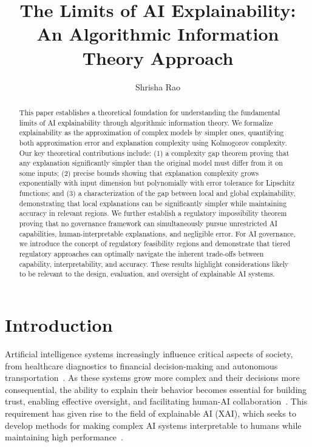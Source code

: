 \documentclass[11pt,letter,leqno]{article}
\title{The Limits of AI Explainability: \\An Algorithmic Information Theory Approach}
\author{Shrisha Rao}
\date{}
\begin{document}
\maketitle

\begin{abstract}
  This paper establishes a theoretical foundation for understanding the fundamental limits of AI explainability through algorithmic information theory.  We formalize explainability as the approximation of complex models by simpler ones, quantifying both approximation error and explanation complexity using Kolmogorov complexity.  Our key theoretical contributions include: (1) a complexity gap theorem proving that any explanation significantly simpler than the original model must differ from it on some inputs; (2) precise bounds showing that explanation complexity grows exponentially with input dimension but polynomially with error tolerance for Lipschitz functions; and (3) a characterization of the gap between local and global explainability, demonstrating that local explanations can be significantly simpler while maintaining accuracy in relevant regions.  We further establish a regulatory impossibility theorem proving that no governance framework can simultaneously pursue unrestricted AI capabilities, human-interpretable explanations, and negligible error.  For AI governance, we introduce the concept of regulatory feasibility regions and demonstrate that tiered regulatory approaches can optimally navigate the inherent trade-offs between capability, interpretability, and accuracy.  These results highlight considerations likely to be relevant to the design, evaluation, and oversight of explainable AI systems.
\end{abstract}


\section{Introduction}

Artificial intelligence systems increasingly influence critical aspects of society, from healthcare diagnostics to financial decision-making and autonomous transportation~\cite{Rudin2019, Bhatt2020, Arrieta2020}.  As these systems grow more complex and their decisions more consequential, the ability to explain their behavior becomes essential for building trust, enabling effective oversight, and facilitating human-AI collaboration~\cite{Doshi-Velez2017, Miller2019}.  This requirement has given rise to the field of explainable AI (XAI), which seeks to develop methods for making complex AI systems interpretable to humans while maintaining high performance~\cite{Gunning2019, Adadi2018}.
\end{document}
